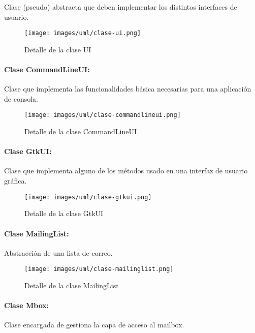 Clase (pseudo) abstracta que deben implementar los distintos interfaces de
usuario.

\begin{figure}[H]
	\centering
 	\texttt{[image: images/uml/clase-ui.png]}
	\caption{Detalle de la clase UI}
	\label{fig:uml:ui-class}
\end{figure}

\paragraph{Clase CommandLineUI:}

Clase que implementa las funcionalidades básica necesarias para una aplicación
de consola.

\begin{figure}[H]
	\centering
 	\texttt{[image: images/uml/clase-commandlineui.png]}
	\caption{Detalle de la clase CommandLineUI}
	\label{fig:uml:commandlineui-class}
\end{figure}

\paragraph{Clase GtkUI:}

Clase que implementa alguno de los métodos usado en una interfaz de usuario
gráfica.

\begin{figure}[H]
	\centering
 	\texttt{[image: images/uml/clase-gtkui.png]}
	\caption{Detalle de la clase GtkUI}
	\label{fig:uml:swaml-class}
\end{figure}

\paragraph{Clase MailingList:}

Abstracción de una lista de correo.

\begin{figure}[H]
	\centering
 	\texttt{[image: images/uml/clase-mailinglist.png]}
	\caption{Detalle de la clase MailingList}
	\label{fig:uml:mailinglist-class}
\end{figure}

\paragraph{Clase Mbox:}

Clase encargada de gestiona la capa de acceso al mailbox.

